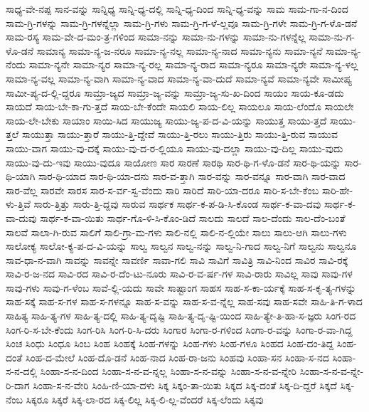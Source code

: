 {ಸಾಧ್ಯ-ವೇ-ನಪ್ಪ
ಸಾನ-ವನ್ನು
ಸಾನ್ನಿಧ್ಯ
ಸಾನ್ನಿ-ಧ್ಯ-ದಲ್ಲಿ
ಸಾನ್ನಿ-ಧ್ಯ-ದಿಂದ
ಸಾನ್ನಿ-ಧ್ಯ-ವನ್ನು
ಸಾಮ
ಸಾಮ-ಗಾ-ನ-ದಿಂದ
ಸಾಮ-ಗ್ರಿ-ಗಳನ್ನು
ಸಾಮ-ಗ್ರಿ-ಗಳನ್ನೆಲ್ಲಾ
ಸಾಮ-ಗ್ರಿ-ಗಳು
ಸಾಮ-ಗ್ರಿ-ಗ-ಳೆ-ಲ್ಲವೂ
ಸಾಮ-ಗ್ರಿ-ಗಳೇ
ಸಾಮ-ಗ್ರಿ-ಗ-ಳೊ-ಡನೆ
ಸಾಮ-ರಸ್ಯ
ಸಾಮ-ವೇ-ದ-ಮಂ-ತ್ರ-ಗಳಿಂದ
ಸಾಮಾ-ನನ್ನು
ಸಾಮಾ-ನು-ಗಳನ್ನು
ಸಾಮಾ-ನು-ಗಳನ್ನೆಲ್ಲ
ಸಾಮಾ-ನು-ಗ-ಳೊ-ಡನೆ
ಸಾಮಾನ್ಯ
ಸಾಮಾ-ನ್ಯ-ಜ-ನರೂ
ಸಾಮಾ-ನ್ಯ-ನಲ್ಲ
ಸಾಮಾ-ನ್ಯ-ನಾದ
ಸಾಮಾ-ನ್ಯನು
ಸಾಮಾ-ನ್ಯನೆ
ಸಾಮಾ-ನ್ಯ-ನೆಂದು
ಸಾಮಾ-ನ್ಯನೇ
ಸಾಮಾ-ನ್ಯರ
ಸಾಮಾ-ನ್ಯ-ರಲ್ಲ
ಸಾಮಾ-ನ್ಯ-ರಾದ
ಸಾಮಾ-ನ್ಯರೂ
ಸಾಮಾ-ನ್ಯರೇ
ಸಾಮಾ-ನ್ಯ-ಳಲ್ಲ
ಸಾಮಾ-ನ್ಯ-ವಲ್ಲ
ಸಾಮಾ-ನ್ಯ-ವಾಗಿ
ಸಾಮಾ-ನ್ಯ-ವಾದ
ಸಾಮಾ-ನ್ಯ-ವಾ-ದುದೆ
ಸಾಮಾ-ನ್ಯವೆ
ಸಾಮಾ-ನ್ಯವೇ
ಸಾಮೀಪ್ಯ
ಸಾಮೀ-ಪ್ಯ-ದ-ಲ್ಲಿ-ದ್ದರೂ
ಸಾಮ್ರಾ-ಜ್ಯದ
ಸಾಮ್ರಾ-ಜ್ಯ-ವನ್ನು
ಸಾಮ್ರಾ-ಜ್ಯ-ಸು-ಖ-ದಿಂದ
ಸಾಯಂ
ಸಾಯ-ಕೂ-ಡದು
ಸಾಯದೆ
ಸಾಯ-ಬೇ-ಕಾ-ಗು-ತ್ತದೆ
ಸಾಯ-ಬೇ-ಕೆಂದೇ
ಸಾಯಲಿ
ಸಾಯ-ಲಿಲ್ಲ
ಸಾಯಲೂ
ಸಾಯ-ಲೆಂದೊ
ಸಾಯಲೇ
ಸಾಯ-ಲೇ-ಬೇಕು
ಸಾಯಾಂ
ಸಾಯಿ-ಸಿದ
ಸಾಯುಜ್ಯ
ಸಾಯು-ಜ್ಯ-ಪ-ದ-ವಿ-ಯನ್ನು
ಸಾಯುತ್ತ
ಸಾಯು-ತ್ತದೆ
ಸಾಯು-ತ್ತಲೆ
ಸಾಯುತ್ತಾ
ಸಾಯು-ತ್ತಾರೆ
ಸಾಯು-ತ್ತಿ-ದ್ದೇವೆ
ಸಾಯು-ತ್ತಿ-ರಲು
ಸಾಯು-ತ್ತಿರು
ಸಾಯು-ತ್ತಿ-ರುವ
ಸಾಯುವ
ಸಾಯು-ವಾಗ
ಸಾಯು-ವು-ದಕ್ಕೆ
ಸಾಯು-ವು-ದ-ರ-ಲ್ಲಿಯೂ
ಸಾಯು-ವು-ದಲ್ಲಾ
ಸಾಯು-ವು-ದಿಲ್ಲ
ಸಾಯು-ವುದು
ಸಾಯು-ವು-ದು-ಇವು
ಸಾಯು-ವುದೂ
ಸಾಯೋಣ
ಸಾರ
ಸಾರಣೆ
ಸಾರಥಿ
ಸಾರ-ಥಿ-ಗ-ಳೊ-ಡನೆ
ಸಾರ-ಥಿ-ಯನ್ನು
ಸಾರ-ಥಿ-ಯಾಗಿ
ಸಾರ-ಥಿ-ಯಾದ
ಸಾರ-ಥಿ-ಯಾ-ದನು
ಸಾರ-ವ-ತ್ತಾಗಿ
ಸಾರ-ವನ್ನು
ಸಾರ-ವನ್ನೂ
ಸಾರ-ವಾಗಿ
ಸಾರ-ವಾದ
ಸಾರ-ವೆಲ್ಲ
ಸಾರವೇ
ಸಾರಸ
ಸಾರ-ಸ-ರ್ವ-ಸ್ವ-ವೆಂದು
ಸಾರಿ
ಸಾರಿದೆ
ಸಾರಿ-ಯಾ-ದರೂ
ಸಾರಿ-ಸ-ಬೇ-ಕೆಂಬ
ಸಾರಿ-ಹೇ-ಳು-ತ್ತಿವೆ
ಸಾರು-ತ್ತಿತ್ತು
ಸಾರು-ತ್ತಿ-ದ್ದವು
ಸಾರುವ
ಸಾರ್ಥಕ
ಸಾರ್ಥ-ಕ-ಪ-ಡಿ-ಸಿ-ಕೊಂಡ
ಸಾರ್ಥ-ಕ-ವಾ-ದವು
ಸಾರ್ಥ-ಕ-ವಾ-ದುವು
ಸಾರ್ಥ-ಕ-ವಾ-ಯಿತು
ಸಾರ್ಥ-ಗೊ-ಳಿ-ಸಿ-ಕೊಂ-ಡಿದೆ
ಸಾಲದು
ಸಾಲದೆ
ಸಾಲ-ದೆಂದು
ಸಾಲ-ದೆಂ-ಬಂತೆ
ಸಾಲವೆ
ಸಾಲಾ-ಗಿ-ರುವ
ಸಾಲಿಗೆ
ಸಾಲಿ-ಗ್ರಾ-ಮ-ಗಳು
ಸಾಲಿ-ನಲ್ಲಿ
ಸಾಲಿ-ನ-ಲ್ಲಿಯೇ
ಸಾಲು
ಸಾಲು-ಆಗಿ
ಸಾಲು-ಗಳು
ಸಾಲೋಕ್ಯ
ಸಾಲೋ-ಕ್ಯ-ಪ-ದ-ವಿ-ಯನ್ನು
ಸಾಲ್ವ
ಸಾಲ್ವನ
ಸಾಲ್ವ-ನನ್ನು
ಸಾಲ್ವ-ನಿ-ಗಾದ
ಸಾಲ್ವ-ನಿಗೆ
ಸಾಲ್ವನು
ಸಾಲ್ವನೂ
ಸಾವ-ಧಾ-ನ-ವಾಗಿ
ಸಾವನ್ನು
ಸಾವನ್ನೇ
ಸಾವರ್ಣಿ
ಸಾವಾ-ಗಲಿ
ಸಾವಿ
ಸಾವಿಗೆ
ಸಾವಿತ್ರಿ
ಸಾವಿ-ನಿಂದ
ಸಾವಿರ
ಸಾವಿ-ರಕ್ಕೆ
ಸಾವಿ-ರ-ಜ-ನದ
ಸಾವಿ-ರದ
ಸಾವಿ-ರ-ದೆಂ-ಟು-ನೂರು
ಸಾವಿ-ರ-ವ-ರ್ಷ-ಗಳ
ಸಾವಿ-ರಾರು
ಸಾವಿಲ್ಲ
ಸಾವು
ಸಾವು-ಗಳ
ಸಾವು-ಗಳು
ಸಾವು-ಗ-ಳೆಂಬ
ಸಾವೆ-ಲ್ಲಿ-ಯದು
ಸಾವೇ
ಸಾಷ್ಟಾಂಗ
ಸಾಹಸ
ಸಾಹ-ಸ-ಕಾ-ರ್ಯಕ್ಕೆ
ಸಾಹ-ಸ-ಕೃ-ತ್ಯ-ಗಳನ್ನು
ಸಾಹ-ಸಕ್ಕೆ
ಸಾಹ-ಸ-ಗಳ
ಸಾಹ-ಸ-ಗಳನ್ನೂ
ಸಾಹ-ಸ-ವನ್ನು
ಸಾಹ-ಸ-ವ-ನ್ನೆಲ್ಲ
ಸಾಹ-ಸವು
ಸಾಹ-ಸವೇ
ಸಾಹಿ-ತಿ-ಗ-ಳಾದ
ಸಾಹಿತ್ಯ
ಸಾಹಿ-ತ್ಯ-ಗಳ
ಸಾಹಿ-ತ್ಯ-ದಲ್ಲಿ
ಸಾಹಿ-ತ್ಯ-ದೃಷ್ಟಿ
ಸಾಹಿ-ತ್ಯ-ದೃ-ಷ್ಟಿ-ಯಿಂದ
ಸಾಹಿ-ತ್ಯೇ-ತಿ-ಹಾ-ಸ-ಜ್ಞರು
ಸಿಂಗ-ರದ
ಸಿಂಗ-ರಿ-ಸ-ಬೇ-ಕೆಂದು
ಸಿಂಗ-ರಿಸಿ
ಸಿಂಗ-ರಿ-ಸಿ-ದರು
ಸಿಂಗಾರ
ಸಿಂಗಾ-ರ-ಗಳಿಂದ
ಸಿಂಗಾ-ರ-ವನ್ನು
ಸಿಂಗಾ-ರ-ವಾ-ಗಿದ್ದ
ಸಿಂಚ
ಸಿಂಧು
ಸಿಂಧೂ
ಸಿಂಬ
ಸಿಂಹ
ಸಿಂಹಕ್ಕೆ
ಸಿಂಹ-ಗಳನ್ನು
ಸಿಂಹ-ಗಳು
ಸಿಂಹ-ಗಳೂ
ಸಿಂಹದ
ಸಿಂಹ-ದಂ-ತಿದ್ದ
ಸಿಂಹ-ದಂತೆ
ಸಿಂಹ-ದ-ಮೇಲೆ
ಸಿಂಹ-ದೊ-ಡನೆ
ಸಿಂಹ-ನಾದ
ಸಿಂಹ-ರಾ-ಜನು
ಸಿಂಹವು
ಸಿಂಹಾ-ಸನ
ಸಿಂಹಾ-ಸ-ನದ
ಸಿಂಹಾ-ಸ-ನ-ದಲ್ಲಿ
ಸಿಂಹಾ-ಸ-ನ-ದಿಂದ
ಸಿಂಹಾ-ಸ-ನ-ವ-ನ್ನಲ್ಲ
ಸಿಂಹಾ-ಸ-ನ-ವನ್ನು
ಸಿಂಹಾ-ಸ-ನ-ವ-ನ್ನೇರಿ
ಸಿಂಹಾ-ಸ-ನ-ವ-ನ್ನೇ-ರಿ-ದಾಗ
ಸಿಂಹಾ-ಸ-ನ-ವೇರಿ
ಸಿಂಹಿ-ಣಿ-ಯಾ-ದಳು
ಸಿಕ್ಕ
ಸಿಕ್ಕಂ-ತಾ-ಯಿತು
ಸಿಕ್ಕದ
ಸಿಕ್ಕ-ದಂತೆ
ಸಿಕ್ಕ-ದಿ-ದ್ದರೆ
ಸಿಕ್ಕದೆ
ಸಿಕ್ಕ-ನೆಂಬ
ಸಿಕ್ಕರೂ
ಸಿಕ್ಕರೆ
ಸಿಕ್ಕ-ಲಾ-ರದ
ಸಿಕ್ಕ-ಲಿಲ್ಲ
ಸಿಕ್ಕ-ಲಿ-ಲ್ಲ-ವೆಂದರೆ
ಸಿಕ್ಕ-ಲೆಂದು
ಸಿಕ್ಕವು
}
